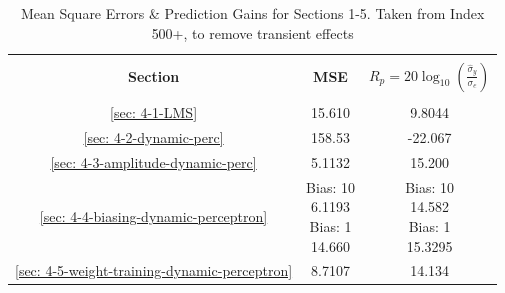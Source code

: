 \documentclass[12pt]{article}
\numberwithin{equation}{section}
\begin{document}
		\begin{minipage}[t]{0.45\textwidth}
			\centering
			\begin{table}[H]
				\centering
				\begin{tabular}{|c|c|c|}
					\hline
					&&\\[-1em]
					\textbf{Section} & \textbf{MSE} & \textbf{$R_p = 20\log_{10}({\frac{\hat{\sigma}_y}{\sigma_e}})$} \\
					&&\\[-1em]
					\hline
					\hline
					\ref{sec: 4-1-LMS}	&	15.610		&	9.8044 \\
					\hline
					\ref{sec: 4-2-dynamic-perc}	&	158.53	&	-22.067 \\
					\hline
					\ref{sec: 4-3-amplitude-dynamic-perc}	&	5.1132		&	15.200 \\
					\hline
					\ref{sec: 4-4-biasing-dynamic-perceptron} 	&	\makecell{ Bias: 10 \\ 6.1193 \\ Bias: 1 \\ 14.660 \\}		&	\makecell{ Bias: 10 \\ 14.582 \\ Bias: 1 \\ 15.3295 \\} \\
					\hline
					\ref{sec: 4-5-weight-training-dynamic-perceptron}	&	8.7107		&	14.134 \\
					\hline
				\end{tabular}
				\captionsetup{justification=centering}
				\caption{Mean Square Errors \& Prediction Gains for Sections 1-5. Taken from Index 500+, to remove transient effects}
				\label{tab: 4-mse-Rp-500+}
			\end{table}
		\end{minipage}%
		
	
\end{document}
